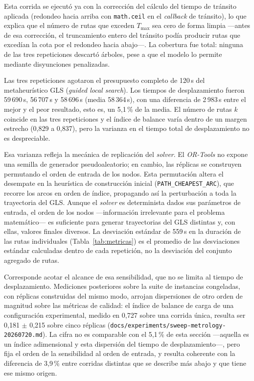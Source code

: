 Esta corrida se ejecutó ya con la corrección del cálculo del tiempo de
tránsito aplicada (redondeo hacia arriba con \texttt{math.ceil} en el
\textit{callback} de tránsito), lo que
explica que el número de rutas que exceden $T_{\max}$ sea cero de forma limpia
---antes de esa corrección, el truncamiento entero del tránsito podía producir
rutas que excedían la cota por el redondeo hacia abajo---. La cobertura fue
total: ninguna de las tres repeticiones descartó árboles, pese a que el modelo
lo permite mediante disyunciones penalizadas.

Las tres repeticiones agotaron el presupuesto completo de 120\,s del
metaheurístico GLS (\textit{guided local search}). Los tiempos de desplazamiento fueron
59\,690\,s, 56\,707\,s y 58\,696\,s (media 58\,364\,s), con una diferencia de
2\,983\,s entre el mejor y el peor resultado, esto es, un 5{,}1\,\% de la media. El
número de rutas $k$ coincide en las tres repeticiones y el índice de balance varía
dentro de un margen estrecho (0{,}829 a 0{,}837), pero la varianza en el tiempo total
de desplazamiento no es despreciable.

Esa varianza refleja la mecánica de replicación del \textit{solver}. El \textit{OR-Tools}
no expone una semilla de generador pseudoaleatorio; en cambio, las réplicas se construyen
permutando el orden de entrada de los nodos. Esta permutación altera el desempate en la
heurística de construcción inicial (\texttt{PATH\_CHEAPEST\_ARC}), que recorre los arcos
en orden de índice, propagando así la perturbación a toda la trayectoria del GLS.
Aunque el \textit{solver} es determinista dados sus parámetros de entrada, el orden de
los nodos ---información irrelevante para el problema matemático--- es suficiente para
generar trayectorias del GLS distintas y, con ellas, valores finales diversos. La
desviación estándar de 559\,s en la duración de las rutas individuales
(Tabla~\ref{tab:metricas}) es el promedio de las desviaciones estándar calculadas
dentro de cada repetición, no la desviación del conjunto agregado de rutas.

Corresponde acotar el alcance de esa sensibilidad, que no se limita al tiempo de
desplazamiento. Mediciones posteriores sobre la suite de instancias congeladas,
con réplicas construidas del mismo modo, arrojan dispersiones de otro orden de
magnitud sobre las métricas de calidad: el índice de balance de carga de una
configuración experimental, medido en 0{,}727 sobre una corrida única, resulta ser
0{,}181 $\pm$ 0{,}215 sobre cinco réplicas
(\texttt{docs/experiments/sweep-metrology-20260720.md}). La cifra no es
comparable con el 5{,}1\,\% de esta sección ---aquella es un índice adimensional y
esta dispersión del tiempo de desplazamiento---, pero fija el orden de la
sensibilidad al orden de entrada, y resulta coherente con la diferencia de
3{,}9\,\% entre corridas distintas que se describe más abajo y que tiene ese mismo
origen.

